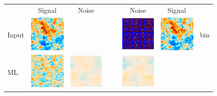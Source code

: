 \documentclass{aa}
\newenvironment{closetabcols}[1][0.5mm]{\setlength{\tabcolsep}{#1}}{}
\begin{document}
\begin{figure}
	\centering
	\hspace*{-10mm}\begin{closetabcols}
		\begin{tabular}{C{13mm}ccm{1mm}|m{1mm}ccC{14mm}}
			& Signal & Noise & & & Noise & Signal & \\
		Input &
		\includegraphics[width=30mm,valign=m]{subpix/toy2d_input_signal_map.png} &
		& & &
		\includegraphics[width=30mm,valign=m]{subpix/toy2d_binned_nn_noise_map.png} &
		\includegraphics[width=30mm,valign=m]{subpix/toy2d_binned_nn_signal_map.png} &
		bin \\[13.6mm]
		ML &
		\includegraphics[width=30mm,valign=m]{subpix/toy2d_ml_nn_signal_map.png} &
		\includegraphics[width=30mm,valign=m]{subpix/toy2d_ml_nn_noise_map.png} & & &
		\includegraphics[width=30mm,valign=m]{subpix/toy2d_destripe_plain_004_nn_noise_map.png} &

\end{tabular}
\end{closetabcols}
\end{figure}
\end{document}
